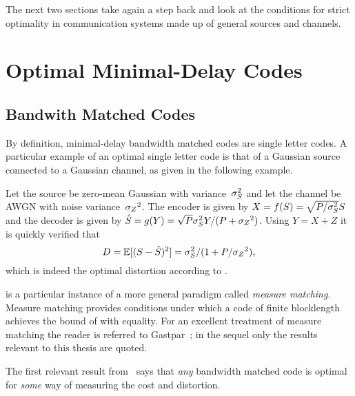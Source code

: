 The next two sections take again a step back and look at the conditions for
strict optimality in communication systems made up of general sources and
channels.


\section{Optimal Minimal-Delay Codes}\label{sec:optmindel}

\subsection{Bandwith Matched Codes}

By definition, minimal-delay bandwidth matched codes are single letter codes. A
particular example of an optimal single letter code is that of a Gaussian source
connected to a Gaussian channel, as given in the following example.
\begin{example}
  \label{ex:gausssingle}
  Let the source be zero-mean Gaussian with variance~${\sigma_S^2}$ and let the channel
  be AWGN with noise variance~${{\sigma_Z}^2}$. The encoder is given by $X = f(S) =
  \sqrt{P/{\sigma_S^2}} S$ and the decoder is given by ${\hat{S}} = g(Y) = \sqrt{P} {\sigma_S^2} Y /
  (P + {{\sigma_Z}^2})$. Using $Y = X + Z$ it is quickly verified that 
  \begin{equation*}
    D = \mathbb{E}[(S - {\hat{S}})^2] = {\sigma_S^2} / (1 + P/{{\sigma_Z}^2}),
  \end{equation*}
  which is indeed the optimal distortion according to .
\end{example}

 is a particular instance of a more general paradigm called
\emph{measure matching}. Measure matching provides conditions under which a code
of finite blocklength achieves the bound of  with equality.
For an excellent treatment of measure matching the reader is referred to
Gastpar~\cite{GastparRV2003,GastparThesis}; in the sequel only the results
relevant to this thesis are quoted.

The first relevant result from~\cite{GastparRV2003} says that \emph{any}
bandwidth matched code is optimal for \emph{some} way of measuring the cost and
distortion.

